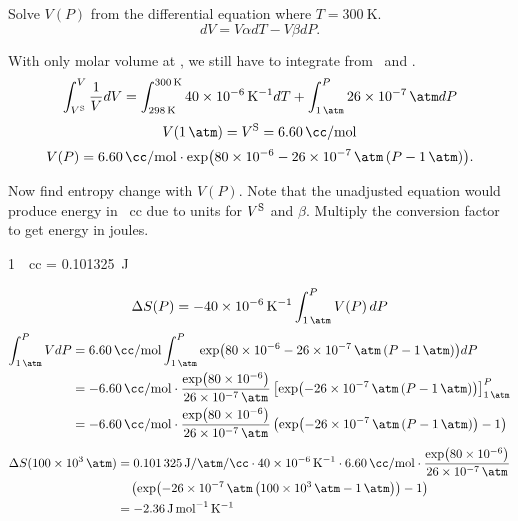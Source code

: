 \begin{@empty}
\begin{answer}
\begin{enumerate}
\begin{@empty}
                Solve $V(P)$ from the differential equation where $T =
                \SI{300}{\kelvin}$.
                \[ dV = V\alpha dT - V\beta dP.\]

                With only molar volume at \stdT, we still have to integrate
                from \stdT\ and \stdP.
                \[
                    \int_{V^{\text S}}^V \frac1V dV
                    = \int_{\stdT}^{\SI{300}{\kelvin}} \thisa dT
                    + \int_{\stdP}^P \thisb dP
                \]
                \[ V(\stdP) = V^{\text S} = \SI{6.60}{\cc/\mol} \]
                \[
                    V(P) = \thisVS \cdot \exp \Left( \exponent \Right).
                \]

                Now find entropy change with $V(P)$.  Note that the unadjusted
                equation would produce energy in \si{\atm.cc} due to units for
                $V^{\text S}$ and $\beta$.  Multiply the conversion factor to get
                energy in joules.
                \begin{center}
                    \SI{1}{\atm.cc} = \SI{0.101325}{\joule}
                \end{center}
                \[ \Delta S(P) = -\thisa \int_{\stdP}^P V(P)\,dP \]
                \begin{align*}
                    \int_{\stdP}^P V dP &= \thisVS \int_{\stdP}^P \exp \Left( \exponent \Right) dP \\
                    &= -\thisVS \cdot \frac{\exp \Left( \num{80e-6} \Right)}{\thisb}
                        \left[ \exp \Left( -\thisb \left( P - \stdP \right) \Right) \right]_{\stdP}^P \\
                    &= -\thisVS \cdot \frac{\exp \Left( \num{80e-6} \Right)}{\thisb}
                        \left( \exp \Left( -\thisb \left( P - \stdP \right) \Right) - 1 \right)
                \end{align*}
                \begin{align*}
                    \Delta S(\SI{100e3}{\atm}) &= \SI[per-mode=fraction]{0.101325}{\joule\per\atm\per\cc}
                        \cdot \thisa \cdot \thisVS \cdot \frac{\exp \Left( \num{80e-6} \Right)}{\thisb} \\
                        &\quad \left( \exp \Left( -\thisb \left( \SI{100e3}{\atm} - \stdP \right) \Right) - 1 \right) \\
                        &= \SI{-2.36}{\joule\per\mol\per\kelvin}
                \end{align*}
            \end{@empty}


\end{enumerate}
\end{answer}
\end{@empty}
